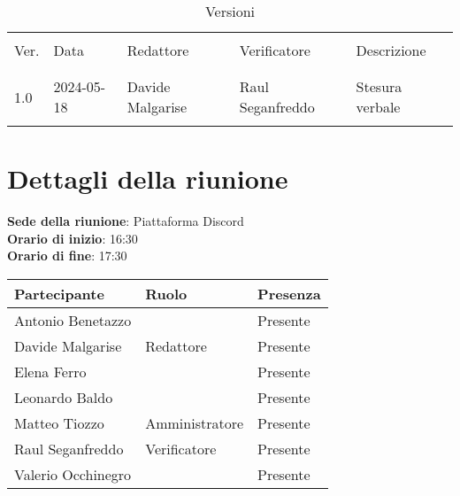 \documentclass[italian,12pt]{article}
\begin{document}


\newpage



\begin{table}[!h]
	\caption{Versioni}
	\footnotesize
	\begin{center}
		\begin{tabular}{ l l l l l }
			\hline                                                             \\[-2ex]
			Ver. & Data       & Redattore   & Verificatore   & Descrizione     \\
			\\[-2ex] \hline \\[-1.5ex]
			1.0  & 2024-05-18 & Davide Malgarise & Raul Seganfreddo & Stesura verbale \\
			\\[-1.5ex] \hline
		\end{tabular}
	\end{center}
\end{table}

\newpage

\tableofcontents

\newpage

\section{Dettagli della riunione}


\textbf{Sede della riunione}: Piattaforma Discord\\
\textbf{Orario di inizio}: 16:30\\
\textbf{Orario di fine}: 17:30\\


\begin{flushleft}
	\begin{table}[!h]
		\begin{tabular}{ |l|l|l| }
			\hline
			\textbf{Partecipante} & \textbf{Ruolo} & \textbf{Presenza} \\
			\hline
			Antonio Benetazzo     &                & Presente          \\
			Davide Malgarise      & Redattore      & Presente          \\
			Elena Ferro           & 		       & Presente          \\
			Leonardo Baldo        & 		       & Presente          \\
			Matteo Tiozzo         & Amministratore & Presente          \\
			Raul Seganfreddo      & Verificatore   & Presente          \\
			Valerio Occhinegro    &                & Presente          \\
			\hline
		\end{tabular}
	\end{table}
\end{flushleft}
\end{document}
